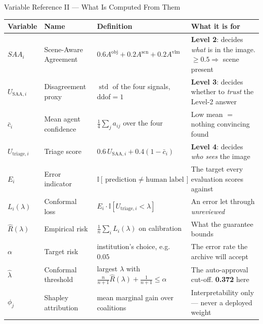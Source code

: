 \documentclass[aspectratio=169,11pt]{beamer}
\begin{document}
\begin{frame}{Variable Reference II --- What Is Computed From Them}
\tiny
\begin{center}
\renewcommand{\arraystretch}{0.92}
\begin{tabular}{@{}p{1.9cm} p{3.1cm} p{3.4cm} p{4.2cm}@{}}
\toprule
\textbf{Variable} & \textbf{Name} & \textbf{Definition} & \textbf{What it is for} \\
\midrule
$SAA_i$ & Scene-Aware Agreement & $0.6A^{\text{obj}}+0.2A^{\text{scn}}+0.2A^{\text{vlm}}$ & \textbf{Level 2}: decides \emph{what} is in the image. $\ge0.5 \Rightarrow$ scene present \\
\addlinespace
$U_{\text{SAA},i}$ & Disagreement proxy & $\operatorname{std}$ of the four signals, ddof$=1$ & \textbf{Level 3}: decides whether to \emph{trust} the Level-2 answer \\
\addlinespace
$\bar c_i$ & Mean agent confidence & $\tfrac14\sum_j a_{ij}$ over the four & Low mean $=$ nothing convincing found \\
\addlinespace
$U_{\text{triage},i}$ & Triage score & $0.6\,U_{\text{SAA},i}+0.4(1-\bar c_i)$ & \textbf{Level 4}: decides \emph{who sees} the image \\
\addlinespace
$E_i$ & Error indicator & $\mathbb{I}[\,\text{prediction} \neq \text{human label}\,]$ & The target every evaluation scores against \\
\addlinespace
$L_i(\lambda)$ & Conformal loss & $E_i \cdot \mathbb{I}[U_{\text{triage},i} < \lambda]$ & An error let through \emph{unreviewed} \\
\addlinespace
$\hat R(\lambda)$ & Empirical risk & $\tfrac1n\sum_i L_i(\lambda)$ on calibration & What the guarantee bounds \\
\addlinespace
$\alpha$ & Target risk & institution's choice, e.g.\ $0.05$ & The error rate the archive will accept \\
\addlinespace
$\hat\lambda$ & Conformal threshold & largest $\lambda$ with $\tfrac{n}{n+1}\hat R(\lambda)+\tfrac1{n+1}\le\alpha$ & The auto-approval cut-off. \textbf{0.372} here \\
\addlinespace
$\phi_j$ & Shapley attribution & mean marginal gain over coalitions & Interpretability only --- never a deployed weight \\
\bottomrule
\end{tabular}
\end{center}
\end{frame}
\end{document}
